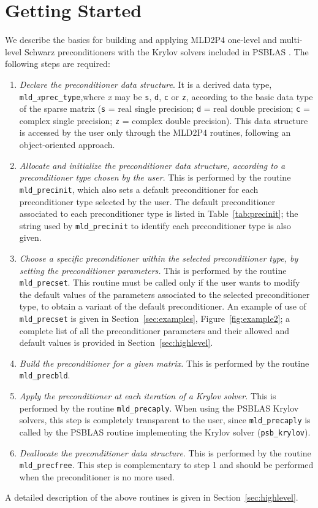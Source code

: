 \section{Getting Started\label{sec:started}}

We describe the basics for building and applying MLD2P4 one-level and multi-level
Schwarz preconditioners with the Krylov solvers included in PSBLAS \cite{}.
The following steps are required:
\begin{enumerate} 
\item \emph{Declare the preconditioner data structure}. It is a derived data type,
  \verb|mld_|\emph{x}\verb|prec_type|,where \emph{x} may be \verb|s|, \verb|d|, \verb|c|
	or \verb|z|, according to the basic data type of the sparse matrix
	(\verb|s| = real single precision; \verb|d| = real double precision;
	\verb|c| = complex single precision; \verb|z| = complex double precision).
	This data structure is accessed by the user only through the MLD2P4 routines,
	following an object-oriented approach.
\item \emph{Allocate and initialize the preconditioner data structure, according to
	a preconditioner type chosen by the user}. This is performed by the routine
	\verb|mld_precinit|, which also sets a default preconditioner for each preconditioner
	type selected by the user. The default preconditioner associated to each preconditioner
	type is listed in Table~\ref{tab:precinit}; the string used by \verb|mld_precinit|
	to identify each preconditioner type is also given.
\item \emph{Choose a specific preconditioner within the selected preconditioner type, by setting
  the preconditioner parameters.} This is performed by the routine \verb|mld_precset|.
  This routine must be called only if the user wants to modify the default values
  of the parameters associated to the selected preconditioner type, to obtain a variant
  of the default preconditioner.
  An example of use of \verb|mld_precset| is given in 
  Section~\ref{sec:examples}, Figure~\ref{fig:example2}; a complete list of all the
  preconditioner parameters and their allowed and default values is provided in 
  Section~\ref{sec:highlevel}. 
\item \emph{Build the preconditioner for a given matrix.} This is performed by
  the routine \verb|mld_precbld|.
\item \emph{Apply the preconditioner at each iteration of a Krylov solver.}
  This is performed by the routine \verb|mld_precaply|. When using the PSBLAS Krylov solvers,
  this step is completely transparent to the user, since \verb|mld_precaply| is called
  by the PSBLAS routine implementing the Krylov solver (\verb|psb_krylov|).
\item \emph{Deallocate the preconditioner data structure}. This is performed by
  the routine \verb|mld_precfree|. This step is complementary to step 1 and should
  be performed when the preconditioner is no more used.
\end{enumerate}
A detailed description of the above routines is given in Section~\ref{sec:highlevel}.

